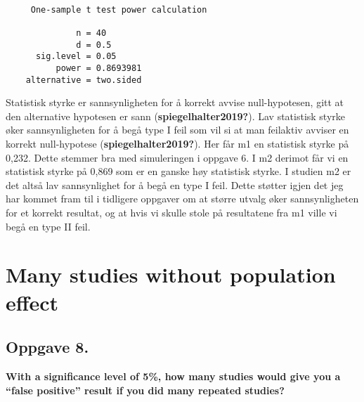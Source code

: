 \documentclass[
  letterpaper,
  DIV=11,
  numbers=noendperiod]{scrreprt}
\begin{document}
\begin{verbatim}

     One-sample t test power calculation 

              n = 40
              d = 0.5
      sig.level = 0.05
          power = 0.8693981
    alternative = two.sided
\end{verbatim}

Statistisk styrke er sannsynligheten for å korrekt avvise
null-hypotesen, gitt at den alternative hypotesen er sann
(\textbf{spiegelhalter2019?}). Lav statistisk styrke øker
sannsynligheten for å begå type I feil som vil si at man feilaktiv
avviser en korrekt null-hypotese (\textbf{spiegelhalter2019?}). Her får
m1 en statistisk styrke på 0,232. Dette stemmer bra med simuleringen i
oppgave 6. I m2 derimot får vi en statistisk styrke på 0,869 som er en
ganske høy statistisk styrke. I studien m2 er det altså lav
sannsynlighet for å begå en type I feil. Dette støtter igjen det jeg har
kommet fram til i tidligere oppgaver om at større utvalg øker
sannsynligheten for et korrekt resultat, og at hvis vi skulle stole på
resultatene fra m1 ville vi begå en type II feil.


\chapter{Many studies without population
effect}\label{many-studies-without-population-effect}

\section{Oppgave 8.}\label{oppgave-8.}

\textbf{With a significance level of 5\%, how many studies would give
you a ``false positive'' result if you did many repeated studies?}
\end{document}
